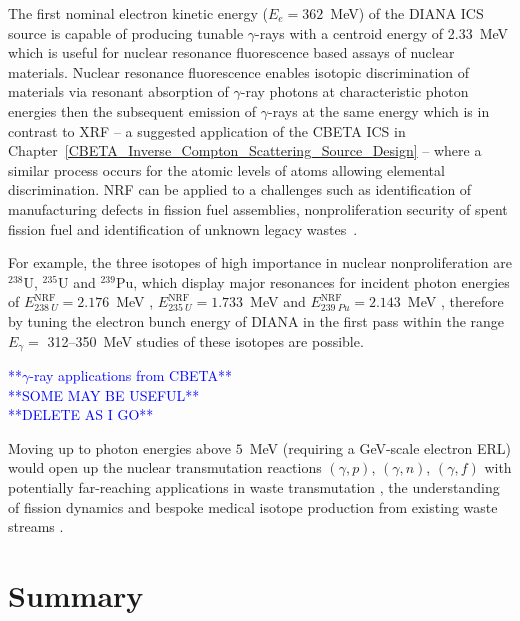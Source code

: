 \documentclass[../main.tex]{subfiles}
\begin{document}
The first nominal electron kinetic energy ($E_{e} = 362$~\si{\mega\electronvolt}) of the DIANA ICS source is capable of producing tunable $\gamma$-rays with a centroid energy of 2.33~\si{\mega\electronvolt} which is useful for nuclear resonance fluorescence based assays of nuclear materials. Nuclear resonance fluorescence enables isotopic discrimination of materials via resonant absorption of $\gamma$-ray photons at characteristic photon energies then the subsequent emission of $\gamma$-rays at the same energy which is in contrast to XRF -- a suggested application of the CBETA ICS in Chapter~\ref{CBETA_Inverse_Compton_Scattering_Source_Design} -- where a similar process occurs for the atomic levels of atoms allowing elemental discrimination. NRF can be applied to a challenges such as identification of manufacturing defects in fission fuel assemblies, nonproliferation security of spent fission fuel and identification of unknown legacy wastes~\cite{angal2018perle,angell2015demonstration,bolind2015states,geddes2017impact,kwan2011discrete}.

For example, the three isotopes of high importance in nuclear nonproliferation are $^{238}\mathrm{U}$, $^{235}\mathrm{U}$ and $^{239}\mathrm{Pu}$, which display major resonances for incident photon energies of $E_{238~U}^{\mathrm{NRF}} = 2.176$~\si{\mega\electronvolt} \cite{quiter2011transmission},  $E_{235~U}^{\mathrm{NRF}} = 1.733$~\si{\mega\electronvolt} and  $E_{239~Pu}^{\mathrm{NRF}} = 2.143$~\si{\mega\electronvolt} \cite{hayakawa2010nondestructive}, therefore by tuning the electron bunch energy of DIANA in the first pass within the range $E_{\gamma} =$ 312--350~\si{\mega\electronvolt} studies of these isotopes are possible.

\textcolor{blue}{**$\gamma$-ray applications from CBETA** \\ **SOME MAY BE USEFUL** \\ **DELETE AS I GO**}

 
 Moving up to photon energies above $5$~\si{\mega\electronvolt} (requiring a \si{\giga\electronvolt}-scale electron ERL) would open up the nuclear transmutation reactions $(\gamma,p)$, $(\gamma,n)$, $(\gamma,f)$ with potentially far-reaching applications in waste transmutation \cite{ur2017optimization}, the understanding of fission dynamics \cite{bellia1983towards,bhike2017exploratory,finch2018monoenergetic} and bespoke medical isotope production from existing waste streams \cite{habs2011production}. 

\section{Summary}
\end{document}

